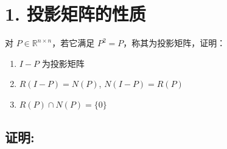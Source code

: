 \documentclass[12pt, a4paper]{article}
\begin{document}
\section*{1. 投影矩阵的性质}

对 $P \in \mathbb{R}^{n \times n}$，若它满足 $P^2=P$，称其为投影矩阵，证明：
\begin{enumerate}
    \item $I-P$ 为投影矩阵
    \item $R(I-P) = N(P)$, $N(I-P) = R(P)$
    \item $R(P) \cap N(P) = \{0\}$
\end{enumerate}

\subsection*{证明:}
\end{document}
